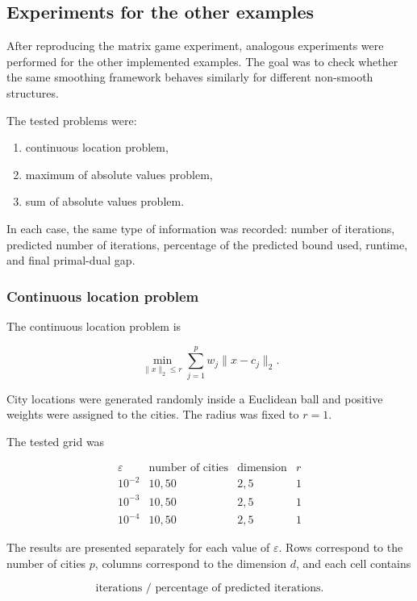 \documentclass[11pt]{article}
\begin{document}
\subsection{Experiments for the other examples}

After reproducing the matrix game experiment, analogous experiments were
performed for the other implemented examples. The goal was to check whether the
same smoothing framework behaves similarly for different non-smooth structures.

The tested problems were:

\begin{enumerate}
    \item continuous location problem,
    \item maximum of absolute values problem,
    \item sum of absolute values problem.
\end{enumerate}

In each case, the same type of information was recorded: number of iterations,
predicted number of iterations, percentage of the predicted bound used, runtime,
and final primal-dual gap.

\subsubsection{Continuous location problem}

The continuous location problem is

\[
    \min_{\|x\|_2\le r}
    \sum_{j=1}^p w_j\|x-c_j\|_2.
\]

City locations were generated randomly inside a Euclidean ball and positive
weights were assigned to the cities. The radius was fixed to \(r=1\).

The tested grid was

\[
\begin{array}{c|c|c|c}
\varepsilon & \text{number of cities} & \text{dimension} & r\\
\hline
10^{-2} & 10,50 & 2,5 & 1\\
10^{-3} & 10,50 & 2,5 & 1\\
10^{-4} & 10,50 & 2,5 & 1
\end{array}
\]

The results are presented separately for each value of \(\varepsilon\). Rows
correspond to the number of cities \(p\), columns correspond to the dimension
\(d\), and each cell contains

\[
    \text{iterations / percentage of predicted iterations}.
\]
\end{document}
